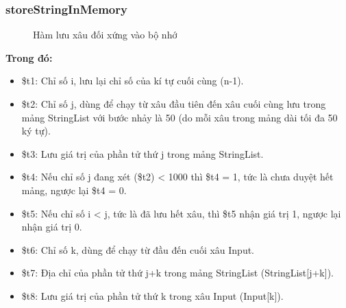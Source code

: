 \documentclass[a4paper,12pt]{article}
\begin{document}
\subsubsection{storeStringInMemory}
\begin{figure}[!h]
    \centerline{}
	\label{fig:bai6}
\end{figure}
\begin{figure}[!h]
	\centerline{}
	\caption{Hàm lưu xâu đối xứng vào bộ nhớ}
	\label{fig:bai6}
\end{figure}
\noindent
\clearpage
\textbf{Trong đó: }
\begin{itemize}
    \item \$t1: Chỉ số i, lưu lại chỉ số của kí tự cuối cùng (n-1).
    \item \$t2: Chỉ số j, dùng để chạy từ xâu đầu tiên đến xâu cuối cùng lưu trong mảng StringList với bước nhảy là 50 (do mỗi xâu trong mảng dài tối đa 50 ký tự).
    \item \$t3: Lưu giá trị của phần tử thứ j trong mảng StringList.
    \item \$t4: Nếu chỉ số j đang xét (\$t2) < 1000 thì \$t4 = 1, tức là chưa duyệt hết mảng, ngược lại \$t4 = 0.
    \item \$t5: Nếu chỉ số i < j, tức là đã lưu hết xâu, thì \$t5 nhận giá trị 1, ngược lại nhận giá trị 0.
    \item \$t6: Chỉ số k, dùng để chạy từ đầu đến cuối xâu Input.
    \item \$t7: Địa chỉ của phần tử thứ j+k trong mảng StringList (StringList[j+k]).
    \item \$t8: Lưu giá trị của phần tử thứ k trong xâu Input (Input[k]).
\end{itemize}
\end{document}
